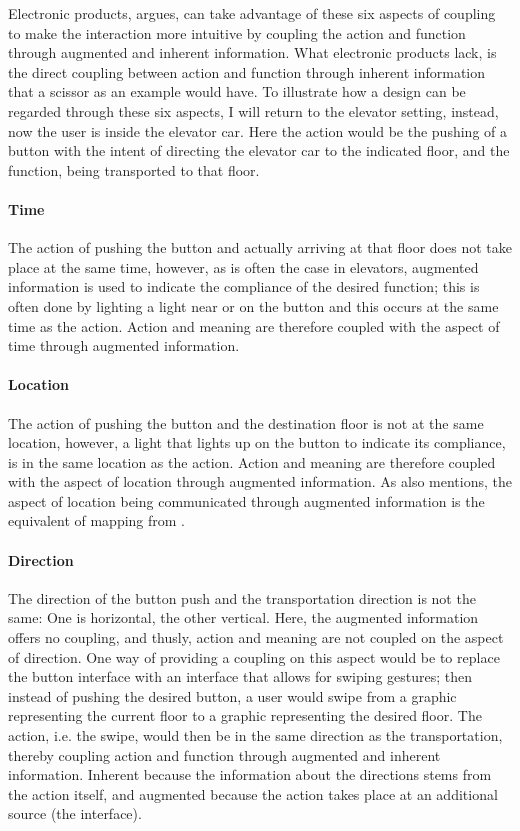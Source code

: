 Electronic products,  argues, can take advantage of these six aspects of coupling to make the interaction more intuitive by coupling the action and function through augmented and inherent information. What electronic products lack, is the direct coupling between action and function through inherent information that a scissor as an example would have. To illustrate how a design can be regarded through these six aspects, I will return to the elevator setting, instead, now the user is inside the elevator car. Here the action would be the pushing of a button with the intent of directing the elevator car to the indicated floor, and the function, being transported to that floor.
\paragraph{Time} The action of pushing the button and actually arriving at that floor does not take place at the same time, however, as is often the case in elevators, augmented information is used to indicate the compliance of the desired function; this is often done by lighting a light near or on the button and this occurs at the same time as the action. Action and meaning are therefore coupled with the aspect of time through augmented information.
\paragraph{Location} The action of pushing the button and the destination floor is not at the same location, however, a light that lights up on the button to indicate its compliance, is in the same location as the action. Action and meaning are therefore coupled with the aspect of location through augmented information. As  also mentions, the aspect of location being communicated through augmented information is the equivalent of mapping from .
\paragraph{Direction} The direction of the button push and the transportation direction is not the same: One is horizontal, the other vertical. Here, the augmented information offers no coupling, and thusly, action and meaning are not coupled on the aspect of direction. One way of providing a coupling on this aspect would be to replace the button interface with an interface that allows for swiping gestures; then instead of pushing the desired button, a user would swipe from a graphic representing the current floor to a graphic representing the desired floor. The action, i.e. the swipe, would then be in the same direction as the transportation, thereby coupling action and function through augmented and inherent information. Inherent because the information about the directions stems from the action itself, and augmented because the action takes place at an additional source (the interface).
